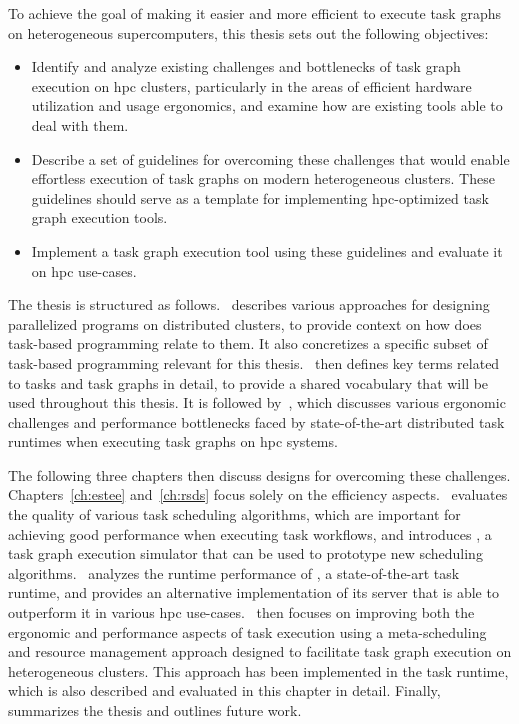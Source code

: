 To achieve the goal of making it easier and more efficient to execute task graphs on heterogeneous
supercomputers, this thesis sets out the following objectives:

\begin{itemize}
	\item Identify and analyze existing challenges and bottlenecks of task graph execution on
	      \gls{hpc} clusters, particularly in the areas of efficient hardware utilization and
	      usage ergonomics, and examine how are existing tools able to deal with them.
	\item Describe a set of guidelines for overcoming these challenges that would enable effortless execution
	      of task graphs on modern heterogeneous clusters. These guidelines should serve as a template for
	      implementing \gls{hpc}-optimized task graph execution tools.
	\item Implement a task graph execution tool using these guidelines and evaluate it on
	      \gls{hpc} use-cases.
\end{itemize}

The thesis is structured as follows.~ describes various approaches for
designing parallelized programs on distributed clusters, to provide context on how does task-based
programming relate to them. It also concretizes a specific subset of task-based programming
relevant for this thesis.~ then defines key terms related to tasks and task
graphs in detail, to provide a shared vocabulary that will be used throughout this thesis. It is
followed by~, which discusses various ergonomic challenges and performance
bottlenecks faced by state-of-the-art distributed task runtimes when executing task graphs on
\gls{hpc} systems.

The following three chapters then discuss designs for overcoming these challenges.
Chapters~\ref{ch:estee} and~\ref{ch:rsds} focus solely on the efficiency
aspects.~ evaluates the quality of various task scheduling algorithms, which
are important for achieving good performance when executing task workflows, and introduces
\estee{}, a task graph execution simulator that can be used to prototype new
scheduling algorithms.~ analyzes the runtime performance of
\dask{}, a state-of-the-art task runtime, and provides an alternative implementation
of its server that is able to outperform it in various \gls{hpc}
use-cases.~ then focuses on improving both the ergonomic and performance
aspects of task execution using a meta-scheduling and resource management approach designed to
facilitate task graph execution on heterogeneous clusters. This approach has been implemented in
the \hyperqueue{} task runtime, which is also described and evaluated in this chapter in
detail. Finally,~ summarizes the thesis and outlines future work.

